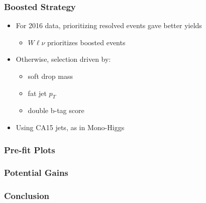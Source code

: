 \documentclass{beamer}
\newcommand{\beginbackup}{
  \newcounter{framenumbervorappendix}
  \setcounter{framenumbervorappendix}{\value{framenumber}}
}
\newcommand{\backupend}{
  \addtocounter{framenumbervorappendix}{-\value{framenumber}}
  \addtocounter{framenumber}{\value{framenumbervorappendix}}
}
\begin{document}
\begin{frame}
  \frametitle{Boosted Strategy}
  \begin{itemize}
  \item For 2016 data, prioritizing resolved events gave better yields
    \begin{itemize}
    \item $W\ell\nu$ prioritizes boosted events
    \end{itemize}
  \item Otherwise, selection driven by:
    \begin{itemize}
    \item soft drop mass
    \item fat jet $p_T$
    \item double b-tag score
    \end{itemize}
  \item Using CA15 jets, as in Mono-Higgs
  \end{itemize}
\end{frame}

\begin{frame}
  \frametitle{Pre-fit Plots}
\end{frame}

\begin{frame}
  \frametitle{Potential Gains}
\end{frame}

\begin{frame}
  \frametitle{Conclusion}
\end{frame}

%
%
%
%
\end{document}
